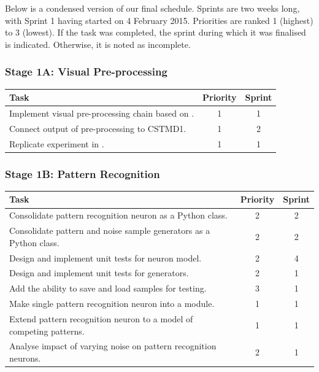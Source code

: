 \documentclass[a4paper,11pt]{article}
\begin{document}
Below is a condensed version of our final schedule. Sprints are two weeks long, with Sprint 1 having started on 4 February 2015. Priorities are ranked 1 (highest) to 3 (lowest). If the task was completed, the sprint during which it was finalised is indicated. Otherwise, it is noted as incomplete.

\subsubsection{Stage 1A: Visual Pre-processing}
\begin{center}
    \begin{tabular}{p{12cm} c c}
    \textbf{Task} & \textbf{Priority} & \textbf{Sprint} \\ \hline
	Implement visual pre-processing chain based on \cite{hal11}. & 1 & 1 \\
	Connect output of pre-processing to CSTMD1. & 1 & 2\\
	Replicate experiment in \cite{w13}. & 1 & 1 \\
    \end{tabular}
\end{center}

\subsubsection{Stage 1B: Pattern Recognition}
\begin{center}
    \begin{tabular}{p{12cm} c c}
    \textbf{Task} & \textbf{Priority} & \textbf{Sprint} \\ \hline
	Consolidate pattern recognition neuron as a Python class. & 2 & 2 \\
	Consolidate pattern and noise sample generators as a Python class. & 2 & 2 \\
	Design and implement unit tests for neuron model. & 2 & 4 \\
	Design and implement unit tests for generators. & 2 & 1 \\
	Add the ability to save and load samples for testing. & 3 & 1 \\
	Make single pattern recognition neuron into a module. & 1 & 1 \\
	Extend pattern recognition neuron to a model of competing patterns. & 1 & 1 \\
	Analyse impact of varying noise on pattern recognition neurons. & 2 & 1 \\
    \end{tabular}
\end{center}
\end{document}
